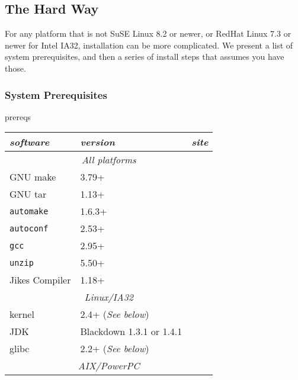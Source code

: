 \subsection{The Hard Way}

 For any platform that is not SuSE Linux 8.2 or newer, or RedHat Linux 7.3 or newer for Intel
IA32, installation can be more complicated.  We present a list of system
prerequisites, and then a series of install steps that assumes you
have those.

\subsubsection{System Prerequisites}

\begin{Label}{prereqs}

\begin{table}[h]
\begin{center}
\begin{tabular}{|l|l|l|} \hline\hline
{\em software} & {\em version} & {\em site} \\ \hline
\multicolumn{3}{|c|}{\em All platforms}                     \\ \hline
GNU make       & 3.79+    & \xlink{\tt \makeURL}{\makeURL}         \\ 
GNU tar        & 1.13+    & \xlink{\tt \tarURL}{\tarURL}           \\ 
{\tt automake}       & 1.6.3+   & \xlink{\tt \automakeURL}{\automakeURL} \\
{\tt autoconf}       & 2.53+    & \xlink{\tt \autoconfURL}{\autoconfURL} \\
{\tt gcc}            & 2.95+    & \xlink{\tt \gccURL}{\gccURL}           \\
{\tt unzip}          & 5.50+    & \xlink{\tt \unzipURL}{\unzipURL}       \\
Jikes Compiler & 1.18+    & \xlink{\tt \jikesURL}{\jikesURL}       \\
\hline
\multicolumn{3}{|c|}{\em Linux/IA32}                      \\ \hline
kernel         & 2.4+ ({\em See below}) & \xlink{\tt \linuxKernelURL}{\linuxKernelURL} \\
JDK            & Blackdown 1.3.1 or 1.4.1 & \xlink{\tt \BlackdownURL}{\BlackdownURL} \\
glibc          & 2.2+ ({\em See below}) & \xlink{\tt \glibcURL}{\glibcURL} \\ \hline
\multicolumn{3}{|c|}{\em AIX/PowerPC}                     \\ \hline

\end{tabular}
\end{center}
\end{table}
\end{Label}
